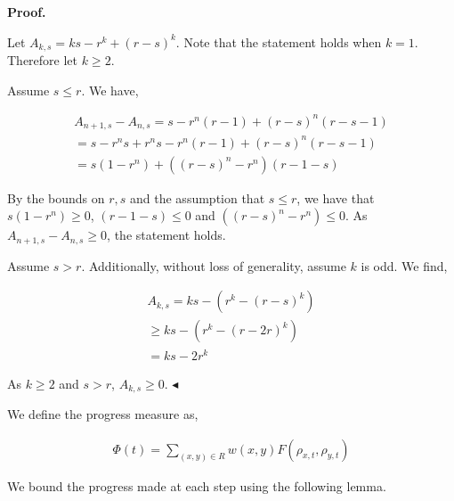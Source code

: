 \par\medskip\noindent\textbf{Proof.}\par




Let $A_{k,s}=ks-r^{k}+(r-s)^{k}$. Note that the statement holds when $k=1$. Therefore let $k\geq 2$.\par




Assume $s\leq r$. We have,\par


\[\begin{gathered}
\displaystyle A_{n+1,s}-A_{n,s} \displaystyle=s-r^{n}(r-1)+(r-s)^{n}(r-s-1) \\
\displaystyle=s-r^{n}s+r^{n}s-r^{n}(r-1)+(r-s)^{n}(r-s-1) \\
\displaystyle=s(1-r^{n})+((r-s)^{n}-r^{n})(r-1-s)
\end{gathered}\]


By the bounds on $r,s$ and the assumption that $s\leq r$, we have that $s(1-r^{n})\geq 0$, $(r-1-s)\leq 0$ and $((r-s)^{n}-r^{n})\leq 0$. As $A_{n+1,s}-A_{n,s}\geq 0$, the statement holds.\par




Assume $s>r$. Additionally, without loss of generality, assume $k$ is odd. We find,\par


\[\begin{gathered}
\displaystyle A_{k,s} \displaystyle=ks-(r^{k}-(r-s)^{k}) \\
\displaystyle\geq ks-(r^{k}-(r-2r)^{k}) \\
\displaystyle=ks-2r^{k}
\end{gathered}\]


As $k\geq 2$ and $s>r$, $A_{k,s}\geq 0$.
$\blacktriangleleft$\par




We define the progress measure as,\par


\[\begin{gathered}
\displaystyle\Phi(t)=\sum_{(x,y)\in R}w(x,y)F(\rho_{x,t},\rho_{y,t})
\end{gathered}\]




We bound the progress made at each step using the following lemma.\par




